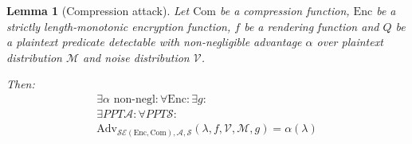\documentclass[conference, letterpaper, 10pt]{IEEEtran}
\newtheorem{lemma}{Lemma}
\begin{document}
\begin{lemma}[Compression attack]

Let $\textrm{Com}$ be a compression function, $\textrm{Enc}$ be a strictly length-monotonic
encryption function, $f$ be a rendering function and $Q$ be a plaintext
predicate detectable with non-negligible advantage $\alpha$ over plaintext
distribution $\mathcal{M}$ and noise distribution $\mathcal{V}$.

Then:
\begin{align*}
    \exists \alpha \text{ non-negl}:
    \forall \textrm{Enc}:
    \exists g:\\
    \exists PPT \mathcal{A}:
    \forall PPT \mathcal{S}:\\
    \text{Adv}_{\mathcal{SE}(\textrm{Enc}, \textrm{Com}), \mathcal{A}, \mathcal{S}}
    (\lambda, f, \mathcal{V}, \mathcal{M}, g) = \alpha(\lambda)
\end{align*}

\end{lemma}
\end{document}
